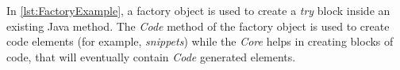In \autoref{lst:FactoryExample}, a factory object is used to create a \textit{try} block inside an existing Java method. The \emph{Code} method of the factory object is used to create code elements (for example, \textit{snippets}) while the \emph{Core} helps in creating blocks of code, that will eventually contain \emph{Code} generated elements.